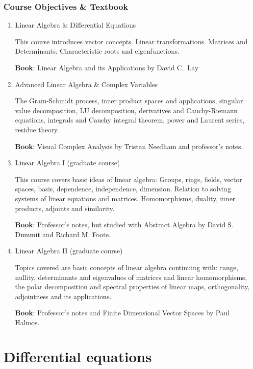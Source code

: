 \documentclass[11pt]{article}
\begin{document}
\subsubsection*{Course Objectives \& Textbook}
\begin{enumerate}
    \item Linear Algebra \& Differential Equations
    
    This course introduces vector concepts. Linear transformations. Matrices and Determinants. Characteristic roots and eigenfunctions.
    
    \textbf{Book}: Linear Algebra and its Applications by David C.\ Lay
    
    \item Advanced Linear Algebra \& Complex Variables
    
    The Gram-Schmidt process, inner product spaces and applications, singular value decomposition, LU decomposition, derivatives and Cauchy-Riemann equations, integrals and Cauchy integral theorem, power and Laurent series, residue theory.
    
    \textbf{Book}: Visual Complex Analysis by Tristan Needham and professor's notes.
    
    \item Linear Algebra I (graduate course)
    
    This course covers basic ideas of linear algebra: Groups, rings, fields, vector spaces, basis, dependence, independence, dimension. Relation to solving systems of linear equations and matrices. Homomorphisms, duality, inner products, adjoints and similarity.
    
    \textbf{Book}: Professor's notes, but studied with Abstract Algebra by 	David S. Dummit and Richard M. Foote.
    
    \item Linear Algebra II (graduate course)
    
    Topics covered are basic concepts of linear algebra continuing with: range, nullity, determinants and eigenvalues of matrices and linear homomorphisms, the polar decomposition and spectral properties of linear maps, orthogonality, adjointness and its applications.
    
    \textbf{Book}: Professor's notes and Finite Dimensional Vector Spaces by Paul Halmos.
\end{enumerate}

\section*{Differential equations}
\end{document}
